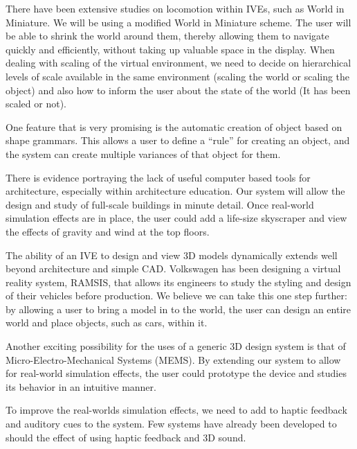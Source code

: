 There have been extensive studies on locomotion within IVEs, such as World in Miniature\cite{Pausch:WorldInMiniature}.
We will be using a modified World in Miniature scheme. The user will be able to shrink the world around them, thereby allowing them to navigate quickly and efficiently, without taking up valuable space in the display. When dealing with scaling of the virtual environment, we need to decide on hierarchical levels of scale available in the same environment (scaling the world or scaling the object) and also how to inform the user about the state of the world (It has been scaled or not). \cite{MSVE}

One feature that is very promising is the automatic creation of object based on shape grammars\cite{Goswell:ShapeGrammer}.
This allows a user to define a ``rule'' for creating an object, and the system can create multiple variances of that object for them.

There is evidence portraying the lack of useful computer based tools for architecture, especially within architecture education\cite{Dobson:Architecture}.
Our system will allow the design and study of full-scale buildings in minute detail.
Once real-world simulation effects are in place, the user could add a life-size skyscraper and view the effects of gravity and wind at the top floors.

The ability of an IVE to design and view 3D models dynamically extends well beyond architecture and simple CAD.
Volkswagen has been designing a virtual reality system, RAMSIS, that allows its engineers to study the styling and design of their vehicles before production\cite{Purschke:Cars}.
We believe we can take this one step further: by allowing a user to bring a model in to the world, the user can design an entire world and place objects, such as cars, within it.

Another exciting possibility for the uses of a generic 3D design system is that of Micro-Electro-Mechanical Systems (MEMS)\cite{Zhao:MEMS}.
By extending our system to allow for real-world simulation effects, the user could prototype the device and studies its behavior in an intuitive manner.

To improve the real-worlds simulation effects, we need to add to haptic feedback\cite{Interactions} and auditory cues\cite{VAS} to the system. Few systems have already been developed to should the effect of using haptic feedback\cite{Vishap} and 3D sound\cite{ASR}. 


